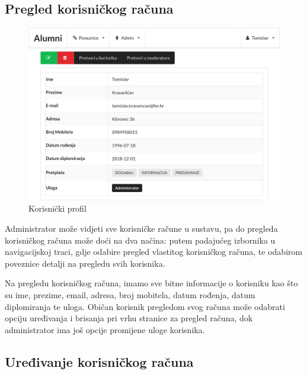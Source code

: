 \documentclass[zavrsni, numeric]{fer}
\begin{document}
\subsection{Pregled korisničkog računa}

\begin{figure}[H]
	\centering
	\includegraphics[width=13cm]{slike/profil.png}
	\caption{Korisnički profil}
	\label{fig:profil}
\end{figure}

Administrator može vidjeti sve korisničke račune u sustavu, pa do pregleda korisničkog računa može doći na dva načina: putem padajućeg izbornika u navigacijskoj traci, gdje odabire pregled vlastitog korisničkog računa, te odabirom poveznice detalji na pregledu svih korisnika.

Na pregledu korisničkog računa, imamo sve bitne informacije o korisniku kao što su ime, prezime, email, adresa, broj mobitela, datum rođenja, datum diplomiranja te uloga. Običan korisnik pregledom svog računa može odabrati opciju uređivanja i brisanja pri vrhu stranice za pregled računa, dok administrator ima još opcije promijene uloge korisnika.

\subsection{Uređivanje korisničkog računa}
\end{document}
